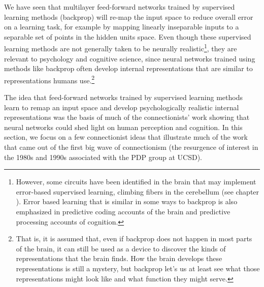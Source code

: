 
We have seen that multilayer feed-forward networks trained by supervised learning methods (\eg backprop) will re-map the input space to reduce overall error on a learning task, for example by mapping linearly inseparable inputs to a separable set of points in the hidden units space. Even though these supervised learning methods are not generally taken to be neurally realistic\footnote{However, some circuits have been identified in the brain that may implement error-based supervised learning, \eg climbing fibers in the cerebellum (see chapter ). Error based learning that is similar in some ways to backprop is also emphasized in predictive coding accounts of the brain and predictive processing accounts of cognition.}, they are relevant to psychology and cognitive science, since neural networks trained using methods like backprop often develop internal representations that are similar to representations humans use.\footnote{That is, it is assumed that, even if backprop does not happen in most parts of the brain, it can still be used as a device to discover the kinds of representations that the brain finds. How the brain develops these representations is still a mystery, but backprop let's us at least see what those representations might look like and what function they might serve.}

The idea that feed-forward networks trained by supervised learning methods learn to remap an input space and develop  psychologically realistic internal representations was the basis of much of the connectionists' work showing that neural networks could shed light on human perception and cognition. In this section, we focus on a few connectionist ideas that illustrate much of the work that came out of the first big wave of connectionism (the resurgence of interest in the 1980s and 1990s associated with the PDP group at UCSD). 

